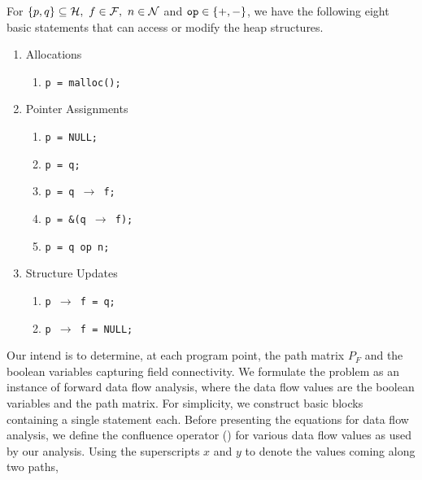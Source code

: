 For $\{p, q\} \subseteq  \mathcal{H},\ f \in\mathcal{F},\ n \in \mathcal{N}$
and $\mbox{\tt op} \in \{+, -\}$, we have the following eight
basic  statements   that  can  access  or   modify  the  heap
structures.
 \begin{enumerate}
   \item Allocations
   	\begin{enumerate}
     	\item {\tt p = malloc();}
   	\end{enumerate}
   \item Pointer Assignments
   	\begin{enumerate}
     	\item {\tt p = NULL;}
     	\item {\tt p = q;}
     	\item {\tt p = q $\rightarrow$ f;}
     	\item {\tt p = \&(q $\rightarrow$ f);}
     	\item {\tt p = q op n;}
   	\end{enumerate}
   \item Structure Updates
   	\begin{enumerate}
     	\item {\tt p $\rightarrow$ f = q;}
     	\item {\tt p $\rightarrow$ f = NULL;}
   	\end{enumerate}
 \end{enumerate}

Our intend is  to determine, at each program  point, the path
matrix  $P_F$  and  the  boolean  variables  capturing  field
connectivity.   We formulate  the problem  as an  instance of
forward data  flow analysis, where  the data flow  values are
the boolean variables and the path matrix. For simplicity, we
construct   basic  blocks   containing  a   single  statement
each. Before presenting the equations for data flow analysis,
we define  the confluence operator (\merge)  for various data
flow values  as used by our analysis.  Using the superscripts
$x$ and $y$ to denote the values coming along two paths,

